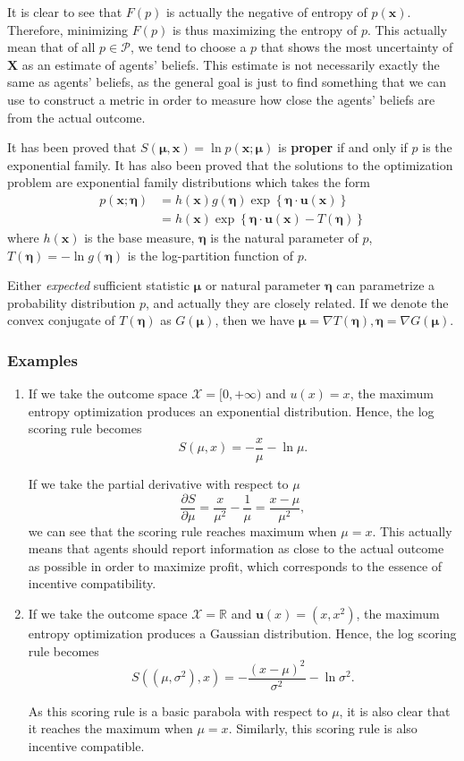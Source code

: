 \documentclass[12pt]{article}
\begin{document}
It is clear to see that $F(p)$ is actually the negative of entropy of $p(\mathbf{x})$. Therefore, minimizing $F(p)$ is thus maximizing the entropy of $p$. This actually mean that of all $p\in \mathcal{P}$, we tend to choose a $p$ that shows the most uncertainty of $\mathbf{X}$ as an estimate of agents' beliefs. This estimate is not necessarily exactly the same as agents' beliefs, as the general goal is just to find something that we can use to construct a metric in order to measure how close the agents' beliefs are from the actual outcome.

It has been proved that $S(\bm{\mu},\mathbf{x})=\ln p(\mathbf{x};\bm{\mu})$ is \textbf{proper} if and only if $p$ is the exponential family. It has also been proved that the solutions to the optimization problem are exponential family distributions which takes the form
\begin{align*}
    p(\mathbf{x};\bm{\eta}) & =h(\mathbf{x})g(\bm{\eta})\exp\left\{ \bm{\eta}\cdot\mathbf{u}(\mathbf{x})\right\}  \\
                            & =h(\mathbf{x})\exp\left\{ \bm{\eta}\cdot\mathbf{u}(\mathbf{x})-T(\bm{\eta})\right\}
\end{align*}
where $h(\mathbf{x})$ is the base measure, $\bm{\eta}$ is the natural parameter of $p$, $T(\bm{\eta})=-\ln g(\bm{\eta})$ is the log-partition function of $p$.

Either \textit{expected} sufficient statistic $\bm{\mu}$ or natural parameter $\bm{\eta}$ can parametrize a probability distribution $p$, and actually they are closely related. If we denote the convex conjugate of $T(\bm{\eta})$ as $G(\bm{\mu})$, then we have $\bm{\mu}=\nabla T(\bm{\eta}),\bm{\eta}=\nabla G(\bm{\mu})$.
\subsubsection{Examples}
\begin{enumerate}
    \item If we take the outcome space $\mathcal{X}=[0,+\infty)$ and $u(x)=x$, the maximum entropy optimization produces an exponential distribution. Hence, the log scoring rule becomes
          \[S(\mu,x)=-\frac{x}{\mu}-\ln\mu.\]

          If we take the partial derivative with respect to $\mu$
          \[\frac{\partial S}{\partial\mu}=\frac{x}{\mu^2}-\frac{1}{\mu}=\frac{x-\mu}{\mu^2},\]
          we can see that the scoring rule reaches maximum when $\mu=x$. This actually means that agents should report information as close to the actual outcome as possible in order to maximize profit, which corresponds to the essence of incentive compatibility.
    \item If we take the outcome space $\mathcal{X}=\mathbb{R}$ and $\mathbf{u}(x)=(x,x^2)$, the maximum entropy optimization produces a Gaussian distribution. Hence, the log scoring rule becomes
          \[S((\mu,\sigma^2),x)=-\frac{(x-\mu)^2}{\sigma^2}-\ln\sigma^2.\]

          As this scoring rule is a basic parabola with respect to $\mu$, it is also clear that it reaches the maximum when $\mu=x$. Similarly, this scoring rule is also incentive compatible.
\end{enumerate}
\end{document}
